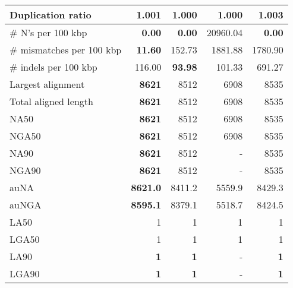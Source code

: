 \documentclass[12pt,a4paper]{article}
\begin{document}
\begin{table}[ht]
\begin{center}
\begin{tabular}{|l*{4}{|r}|}
Duplication ratio & 1.001 & {\bf 1.000} & {\bf 1.000} & 1.003 \\ \hline
\# N's per 100 kbp & {\bf 0.00} & {\bf 0.00} & 20960.04 & {\bf 0.00} \\ \hline
\# mismatches per 100 kbp & {\bf 11.60} & 152.73 & 1881.88 & 1780.90 \\ \hline
\# indels per 100 kbp & 116.00 & {\bf 93.98} & 101.33 & 691.27 \\ \hline
Largest alignment & {\bf 8621} & 8512 & 6908 & 8535 \\ \hline
Total aligned length & {\bf 8621} & 8512 & 6908 & 8535 \\ \hline
NA50 & {\bf 8621} & 8512 & 6908 & 8535 \\ \hline
NGA50 & {\bf 8621} & 8512 & 6908 & 8535 \\ \hline
NA90 & {\bf 8621} & 8512 & - & 8535 \\ \hline
NGA90 & {\bf 8621} & 8512 & - & 8535 \\ \hline
auNA & {\bf 8621.0} & 8411.2 & 5559.9 & 8429.3 \\ \hline
auNGA & {\bf 8595.1} & 8379.1 & 5518.7 & 8424.5 \\ \hline
LA50 & 1 & 1 & 1 & 1 \\ \hline
LGA50 & 1 & 1 & 1 & 1 \\ \hline
LA90 & {\bf 1} & {\bf 1} & - & {\bf 1} \\ \hline
LGA90 & {\bf 1} & {\bf 1} & - & {\bf 1} \\ \hline
\end{tabular}
\end{center}
\end{table}
\end{document}

